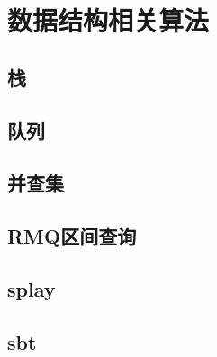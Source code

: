 \section{数据结构相关算法}

\subsection{栈}
\subsection{队列}
\subsection{并查集}
\subsection{RMQ区间查询}
\subsection{splay}
\subsection{sbt}
